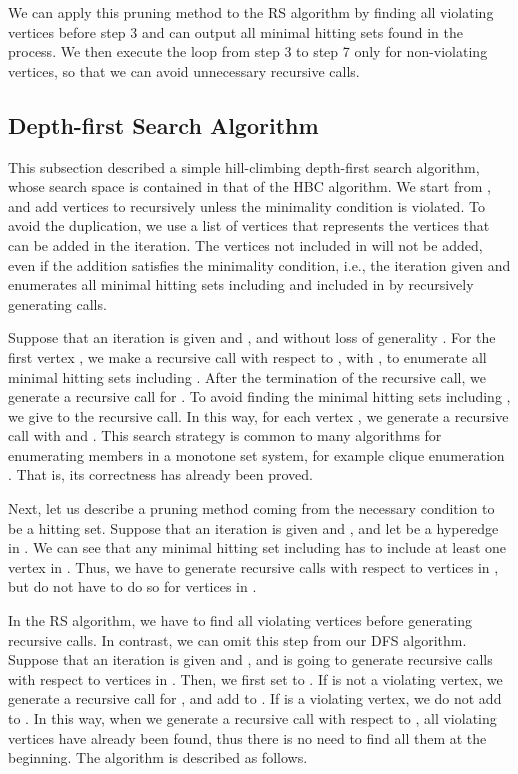 We can apply this pruning method to the RS algorithm by finding all
 violating vertices before step 3 and can output all minimal hitting sets
  found in the process.
We then execute the loop from step 3 to step 7 only for non-violating
 vertices, so that we can avoid unnecessary recursive calls.


\subsection{Depth-first Search Algorithm}

This subsection described a simple hill-climbing depth-first search algorithm,
 whose search space is contained in that of the HBC algorithm.
We start from , and add vertices to  recursively unless
 the minimality condition is violated.
To avoid the duplication, we use a list of vertices  that represents
 the vertices that can be added in the iteration.
The vertices not included in  will not be added, even if the addition
 satisfies the minimality condition, i.e., the iteration given  and
  enumerates all minimal hitting sets including 
 and included in  by recursively generating calls.

Suppose that an iteration is given  and , and without loss of
 generality .
For the first vertex , we make a recursive call with respect to
 , with , to enumerate all minimal
 hitting sets including .
After the termination of the recursive call, we generate a recursive call
 for .
To avoid finding the minimal hitting sets including , we give
  to the recursive call.
In this way, for each vertex , we generate a recursive call with
  and .
This search strategy is common to many algorithms for enumerating members
 in a monotone set system, for example clique enumeration \cite{tomita}.
That is, its correctness has already been proved.

Next, let us describe a pruning method coming from the necessary condition
 to be a hitting set.
Suppose that an iteration is given  and , and let  be a
 hyperedge in .
We can see that any minimal hitting set including  has to include at
 least one vertex in .
Thus, we have to generate recursive calls with respect to vertices in
 , but do not have to do so for vertices in .

In the RS algorithm, we have to find all violating vertices before
 generating recursive calls.
In contrast, we can omit this step from our DFS algorithm.
Suppose that an iteration is given  and , and is going to generate
 recursive calls with respect to vertices in .
Then, we first set  to .
If  is not a violating vertex, we generate a recursive call for
 , and add  to .
If  is a violating vertex, we do not add  to .
In this way, when we generate a recursive call with respect to ,
 all violating vertices  have already been found, thus there is
 no need to find all them at the beginning.
The algorithm is described as follows.


